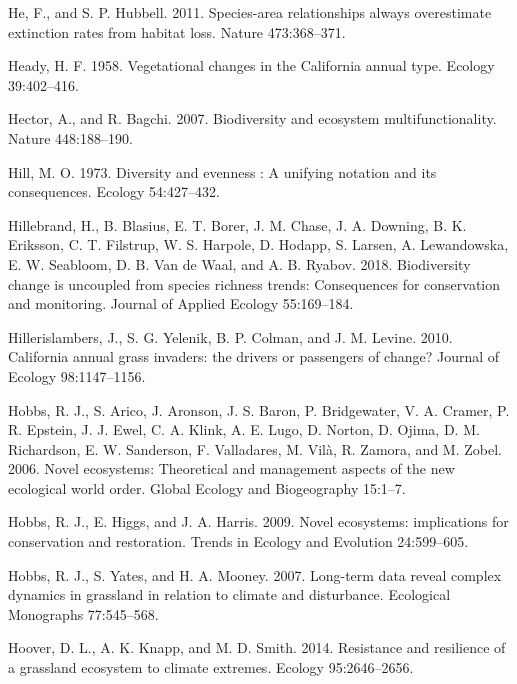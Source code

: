 \documentclass[twoside,12pt,final]{ucthesis-CA2012}
\newlength{\cslhangindent}
\newenvironment{cslreferences}%
  {\setlength{\parindent}{0pt}%
  \everypar{\setlength{\hangindent}{\cslhangindent}}\ignorespaces}%
  {\par}
\begin{document}
\begin{ucmainmatter}
\begin{cslreferences}
\leavevmode\hypertarget{ref-he2011}{}%
He, F., and S. P. Hubbell. 2011. Species-area relationships always overestimate extinction rates from habitat loss. Nature 473:368--371.

\leavevmode\hypertarget{ref-Heady1958}{}%
Heady, H. F. 1958. Vegetational changes in the California annual type. Ecology 39:402--416.

\leavevmode\hypertarget{ref-Hector2007}{}%
Hector, A., and R. Bagchi. 2007. Biodiversity and ecosystem multifunctionality. Nature 448:188--190.

\leavevmode\hypertarget{ref-hil1973}{}%
Hill, M. O. 1973. Diversity and evenness : A unifying notation and its consequences. Ecology 54:427--432.

\leavevmode\hypertarget{ref-hillebrand2018}{}%
Hillebrand, H., B. Blasius, E. T. Borer, J. M. Chase, J. A. Downing, B. K. Eriksson, C. T. Filstrup, W. S. Harpole, D. Hodapp, S. Larsen, A. Lewandowska, E. W. Seabloom, D. B. Van de Waal, and A. B. Ryabov. 2018. Biodiversity change is uncoupled from species richness trends: Consequences for conservation and monitoring. Journal of Applied Ecology 55:169--184.

\leavevmode\hypertarget{ref-Hillerislambers2010}{}%
Hillerislambers, J., S. G. Yelenik, B. P. Colman, and J. M. Levine. 2010. California annual grass invaders: the drivers or passengers of change? Journal of Ecology 98:1147--1156.

\leavevmode\hypertarget{ref-Hobbs2006}{}%
Hobbs, R. J., S. Arico, J. Aronson, J. S. Baron, P. Bridgewater, V. A. Cramer, P. R. Epstein, J. J. Ewel, C. A. Klink, A. E. Lugo, D. Norton, D. Ojima, D. M. Richardson, E. W. Sanderson, F. Valladares, M. Vilà, R. Zamora, and M. Zobel. 2006. Novel ecosystems: Theoretical and management aspects of the new ecological world order. Global Ecology and Biogeography 15:1--7.

\leavevmode\hypertarget{ref-Hobbs2009}{}%
Hobbs, R. J., E. Higgs, and J. A. Harris. 2009. Novel ecosystems: implications for conservation and restoration. Trends in Ecology and Evolution 24:599--605.

\leavevmode\hypertarget{ref-Hobbs2007}{}%
Hobbs, R. J., S. Yates, and H. A. Mooney. 2007. Long-term data reveal complex dynamics in grassland in relation to climate and disturbance. Ecological Monographs 77:545--568.

\leavevmode\hypertarget{ref-Hoover2014}{}%
Hoover, D. L., A. K. Knapp, and M. D. Smith. 2014. Resistance and resilience of a grassland ecosystem to climate extremes. Ecology 95:2646--2656.


\end{cslreferences}
\end{ucmainmatter}
\end{document}
